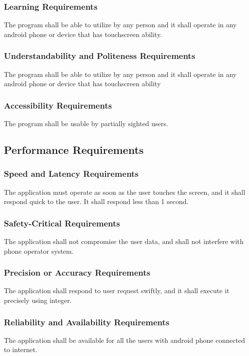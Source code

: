 \documentclass[12pt, titlepage]{article}
\begin{document}
\subsubsection{Learning Requirements}
The program shall be able to utilize by any person and it shall operate in any android phone or device that has touchscreen ability.

\subsubsection{Understandability and Politeness Requirements}
The program shall be able to utilize by any person and it shall operate in any android phone or device that has touchscreen ability

\subsubsection{Accessibility Requirements}
The program shall be usable by partially sighted users.


\subsection{Performance Requirements}
\subsubsection{Speed and Latency Requirements}
The application must operate as soon as the user touches the screen, and it shall respond quick to the user. It shall respond less than 1 second.

\subsubsection{Safety-Critical Requirements}
The application shall not compromise the user data, and shall not interfere with phone operator system. 

\subsubsection{Precision or Accuracy Requirements}
The application shall respond to user request swiftly, and it shall execute it precisely using integer.

\subsubsection{Reliability and Availability Requirements}
The application shall be available for all the users with android phone connected to internet. 
\end{document}
